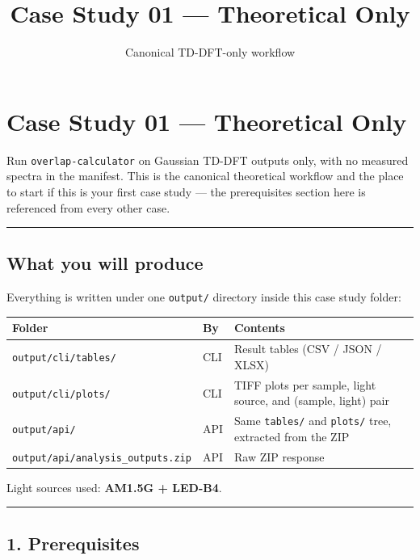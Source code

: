 \documentclass[
  11pt,
]{article}
\title{Case Study 01 — Theoretical Only}
\subtitle{Canonical TD-DFT-only workflow}
\author{}
\date{}
\begin{document}
\maketitle

{
\hypersetup{linkcolor=}
\setcounter{tocdepth}{2}
\tableofcontents
}
\hypertarget{case-study-01--theoretical-only}{
\section{Case Study 01 --- Theoretical
Only}\label{case-study-01--theoretical-only}}

Run \texttt{overlap-calculator} on Gaussian TD-DFT outputs only, with no
measured spectra in the manifest. This is the canonical theoretical
workflow and the place to start if this is your first case study --- the
prerequisites section here is referenced from every other case.

\begin{center}\rule{0.5\linewidth}{0.5pt}\end{center}

\hypertarget{what-you-will-produce}{
\subsection{What you will produce}\label{what-you-will-produce}}

Everything is written under one \texttt{output/} directory inside this
case study folder:

\begin{longtable}[]{@{}lll@{}}
\toprule
Folder & By & Contents \\
\midrule
\endhead
\texttt{output/cli/tables/} & CLI & Result tables (CSV / JSON / XLSX) \\
\texttt{output/cli/plots/} & CLI & TIFF plots per sample, light source,
and (sample, light) pair \\
\texttt{output/api/} & API & Same \texttt{tables/} and \texttt{plots/}
tree, extracted from the ZIP \\
\texttt{output/api/analysis\_outputs.zip} & API & Raw ZIP response \\
\bottomrule
\end{longtable}

Light sources used: \textbf{AM1.5G + LED-B4}.

\begin{center}\rule{0.5\linewidth}{0.5pt}\end{center}

\hypertarget{1-prerequisites}{
\subsection{1. Prerequisites}\label{1-prerequisites}}
\end{document}
